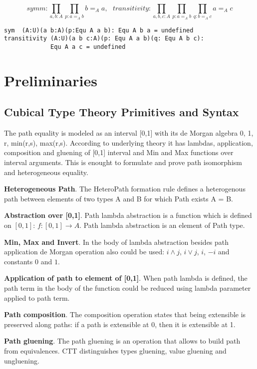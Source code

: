 \documentclass{article}
\begin{document}
$$symm : \prod_{a,b:A} \prod_{p:a =_A b} b =_A a,\ \ \ 
  transitivity : \prod_{a,b,c: A} \prod_{p: a =_A b} \prod_{q: b =_A c} a =_A c$$

\begin{lstlisting}[mathescape=true]
sym  (A:U)(a b:A)(p:Equ A a b): Equ A b a = undefined
transitivity (A:U)(a b c:A)(p: Equ A a b)(q: Equ A b c):
             Equ A a c = undefined
\end{lstlisting}

\section{Preliminaries}

\subsection{Cubical Type Theory Primitives and Syntax}

The path equality is modeled as an interval [0,1] with
its de Morgan algebra 0, 1, r, min(r,s), max(r,s). According to underlying theory
it has lambdas, application, composition and gluening of [0,1] interval and Min and Max
functions over interval arguments. This is enought to formulate and prove path
isomorphism and heterogeneous equality.

{\bf Heterogeneous Path}. The HeteroPath formation rule defines a heterogenous path
between elements of two types A and B for which Path exists A = B.

{\bf Abstraction over [0,1]}. Path lambda abstraction is a function which is defined on $[0,1]$:
$f: [0,1] \rightarrow A$. Path lambda abstraction is an element of Path type.

{\bf Min, Max and Invert}. In the body of lambda abstraction besides path application
de Morgan operation also could be used: $i \wedge j$, $i \vee j$, $i$, $-i$ and constants $0$ and $1$.

{\bf Application of path to element of [0,1]}. When path lambda is defined, the path term
in the body of the function could be reduced using lambda parameter applied to path term.

{\bf Path composition}. The composition operation states that being extensible
is preserved along paths: if a path is extensible at 0, then it is extensible at 1.

{\bf Path gluening}. The path gluening is an operation that allows to build
path from equivalences. CTT distinguishes types gluening, value gluening and ungluening.
\end{document}
